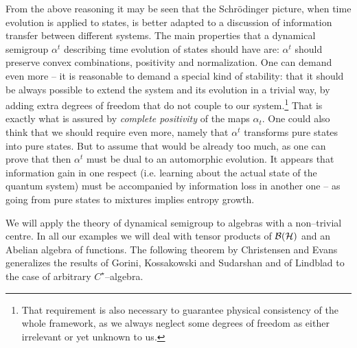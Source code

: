\documentclass[12pt]{article}
\begin{document}
From the above reasoning it may be seen that the Schr\"odinger picture,  when
time evolution is applied to states,  is better adapted to a discussion of
information transfer between different systems.  The main properties that a
dynamical semigroup $\alpha ^t$ describing time evolution of states should
have are:  $\alpha ^t$ should preserve convex combinations,  positivity and
normalization.  One can demand even more -- it is reasonable to demand a
special kind of stability:  
that it should be always possible to extend the
system and its evolution in a trivial way,  by adding extra degrees of
freedom that do not couple to our system.\footnote{That requirement 
is also necessary to guarantee physical consistency of the whole
framework, as we always neglect some degrees of freedom as either
irrelevant or yet unknown to us.}  
That is exactly what is assured by 
{\sl complete positivity} of the maps $\alpha_t. $ One could also think that
we should require even more,  namely that $\alpha ^t$ transforms pure states 
into
pure states.  But to assume that would be already too much,
as one can prove that then
$\alpha^t $ must be dual to an automorphic evolution.  
It appears that information 
gain in one respect  (i.e. learning about the actual 
state of the quantum system) 
must be accompanied by information loss in another one -- as
going from pure states to mixtures implies entropy growth. 

We will apply the theory of dynamical semigroup to algebras with a non--trivial
centre.  In all our examples we will deal with tensor products of 
${\cal B} ({\cal H})$ and an Abelian algebra of functions.  
The following theorem by Christensen and Evans \cite{chr} generalizes the
results of Gorini,  Kossakowski and Sudarshan and of Lindblad to the case of
arbitrary $C^{\star }$--algebra. 
\end{document}
